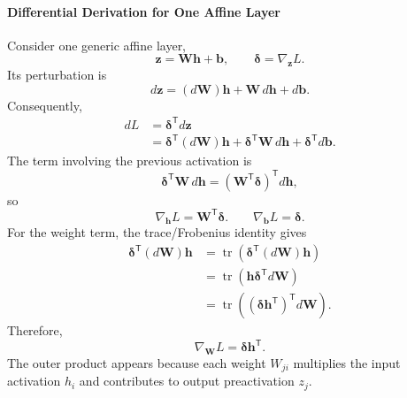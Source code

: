 \documentclass{article}
\begin{document}
\paragraph{Differential Derivation for One Affine Layer}
Consider one generic affine layer,
\[
  \mathbf{z}
  =
  \mathbf{W}\mathbf{h}+\mathbf{b},
  \qquad
  \boldsymbol{\delta}
  =
  \nabla_{\mathbf{z}}L.
\]
Its perturbation is
\[
  d\mathbf{z}
  =
  (d\mathbf{W})\mathbf{h}
  +
  \mathbf{W}\,d\mathbf{h}
  +
  d\mathbf{b}.
\]
Consequently,
\[
  \begin{aligned}
    dL
    &=
    \boldsymbol{\delta}^\mathsf{T}d\mathbf{z}\\
    &=
    \boldsymbol{\delta}^\mathsf{T}(d\mathbf{W})\mathbf{h}
    +
    \boldsymbol{\delta}^\mathsf{T}\mathbf{W}\,d\mathbf{h}
    +
    \boldsymbol{\delta}^\mathsf{T}d\mathbf{b}.
  \end{aligned}
\]
The term involving the previous activation is
\[
  \boldsymbol{\delta}^\mathsf{T}\mathbf{W}\,d\mathbf{h}
  =
  (\mathbf{W}^\mathsf{T}\boldsymbol{\delta})^\mathsf{T}d\mathbf{h},
\]
so
\[
  \boxed{
    \nabla_{\mathbf{h}}L
    =
    \mathbf{W}^\mathsf{T}\boldsymbol{\delta}.
  }
  \qquad
  \boxed{
    \nabla_{\mathbf{b}}L
    =
    \boldsymbol{\delta}.
  }
\]
For the weight term, the trace/Frobenius identity gives
\[
  \begin{aligned}
    \boldsymbol{\delta}^\mathsf{T}(d\mathbf{W})\mathbf{h}
    &=
    \operatorname{tr}
    \left(
      \boldsymbol{\delta}^\mathsf{T}(d\mathbf{W})\mathbf{h}
    \right)\\
    &=
    \operatorname{tr}
    \left(
      \mathbf{h}\boldsymbol{\delta}^\mathsf{T}d\mathbf{W}
    \right)\\
    &=
    \operatorname{tr}
    \left(
      (\boldsymbol{\delta}\mathbf{h}^\mathsf{T})^\mathsf{T}
      d\mathbf{W}
    \right).
  \end{aligned}
\]
Therefore,
\[
  \boxed{
    \nabla_{\mathbf{W}}L
    =
    \boldsymbol{\delta}\mathbf{h}^\mathsf{T}.
  }
\]
The outer product appears because each weight \(W_{ji}\) multiplies the
input activation \(h_i\) and contributes to output preactivation
\(z_j\).
\end{document}
